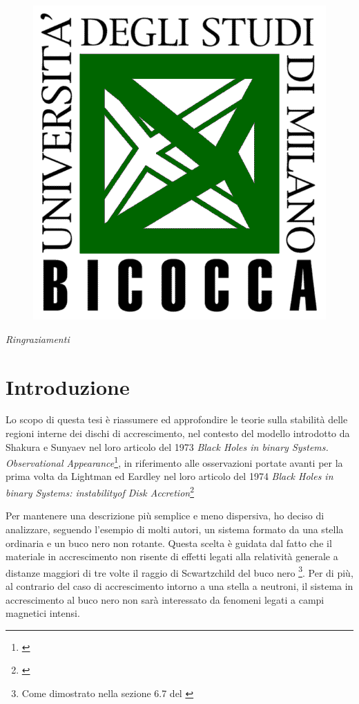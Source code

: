 \documentclass[a4paperbi]{article}
\begin{document}
\begin{titlepage}
	\begin{figure}[H]
		\centering
		\includegraphics[width=0.4\linewidth]{LogoBicocca}
		\label{fig:logobicocca}
	\end{figure} %
\vfill %
\end{titlepage}

\newpage
\clearpage\null

\newpage
\vspace*{\fill}
\textit{Ringraziamenti}\\[2cm]
\vspace*{\fill}

\newpage
\vspace*{\fill}
\tableofcontents
\vspace*{\fill}

\newpage
\section{Introduzione}
	Lo scopo di questa tesi è riassumere ed approfondire le teorie sulla stabilità delle regioni interne dei dischi di accrescimento, nel contesto del modello introdotto da Shakura e Sunyaev nel loro articolo del 1973 \textit{Black Holes in binary Systems. Observational Appearance}\footnote{\cite{ShakuraSunyaev1973}}, in riferimento alle osservazioni portate avanti per la prima volta da Lightman ed Eardley nel loro articolo del 1974 \textit{Black Holes in binary Systems: instabilityof Disk Accretion}\footnote{\cite{LightmanEardley1974}}

	Per mantenere una descrizione più semplice e meno dispersiva, ho deciso di analizzare, seguendo l'esempio di molti autori, un sistema formato da una stella ordinaria e un buco nero non rotante. Questa scelta è guidata dal fatto che il materiale in accrescimento non risente di effetti legati alla relatività generale a distanze maggiori di tre volte il raggio di Scwartzchild del buco nero
\footnote{Come dimostrato nella sezione 6.7 del \cite{FrankKingRaineAccretionPower}}. Per di più, al contrario del caso di accrescimento intorno a una stella a neutroni, il sistema in accrescimento al buco nero non sarà interessato da fenomeni legati a campi magnetici intensi. 
\end{document}
